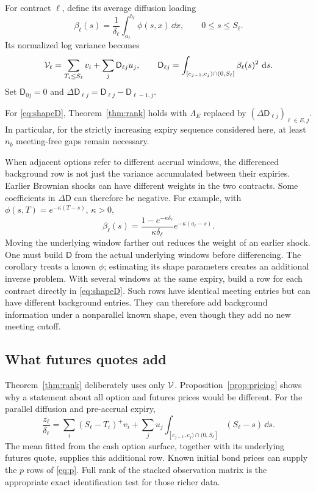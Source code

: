 For contract $\ell$, define its average diffusion loading
\[
\beta_\ell(s)=\frac1{\delta_\ell}\int_{a_\ell}^{b_\ell}\phi(s,x)\,\dd x,
\qquad 0\leq s\leq S_\ell.
\]
Its normalized log variance becomes
\begin{equation}\label{eq:shapeD}
\mathcal V_\ell=\sum_{T_i\leq S_\ell}v_i+\sum_j\mathsf D_{\ell j}u_j,\qquad
\mathsf D_{\ell j}=\int_{[c_{j-1},c_j)\cap(0,S_\ell]}\beta_\ell(s)^2\,\,\mathrm d s.
\end{equation}
Set $\mathsf D_{0j}=0$ and $\Delta \mathsf D_{\ell j}=\mathsf D_{\ell j}-\mathsf D_{\ell-1,j}$.

\begin{corollary}\label{cor:shape}
For \eqref{eq:shapeD}, Theorem~\ref{thm:rank} holds with $\Lambda_E$ replaced by $(\Delta \mathsf D_{\ell j})_{\ell\in E,j}$. In particular, for the strictly increasing expiry sequence considered here, at least $n_b$ meeting-free gaps remain necessary.
\end{corollary}
When adjacent options refer to different accrual windows, the differenced background row is not just the variance accumulated between their expiries. Earlier Brownian shocks can have different weights in the two contracts. Some coefficients in $\Delta\mathsf D$ can therefore be negative. For example, with $\phi(s,T)=e^{-\kappa(T-s)}$, $\kappa>0$,
\[
\beta_\ell(s)=\frac{1-e^{-\kappa\delta_\ell}}{\kappa\delta_\ell}
                  e^{-\kappa(a_\ell-s)}.
\]
Moving the underlying window farther out reduces the weight of an earlier shock. One must build $\mathsf D$ from the actual underlying windows before differencing. The corollary treats a known $\phi$; estimating its shape parameters creates an additional inverse problem. With several windows at the same expiry, build a row for each contract directly in \eqref{eq:shapeD}. Such rows have identical meeting entries but can have different background entries. They can therefore add background information under a nonparallel known shape, even though they add no new meeting cutoff.

\subsection{What futures quotes add}\label{sec:extra}
Theorem~\ref{thm:rank} deliberately uses only $\mathcal V$. Proposition~\ref{prop:pricing} shows why a statement about all option and futures prices would be different. For the parallel diffusion and pre-accrual expiry,
\begin{equation}\label{eq:zrows}
\frac{z_\ell}{\delta_\ell}
=\sum_i(S_\ell-T_i)^+v_i+
  \sum_ju_j\int_{[c_{j-1},c_j)\cap(0,S_\ell]}(S_\ell-s)\,\dd s.
\end{equation}
The mean fitted from the cash option surface, together with its underlying futures quote, supplies this additional row. Known initial bond prices can supply the $p$ rows of \eqref{eq:p}. Full rank of the stacked observation matrix is the appropriate exact identification test for those richer data.

